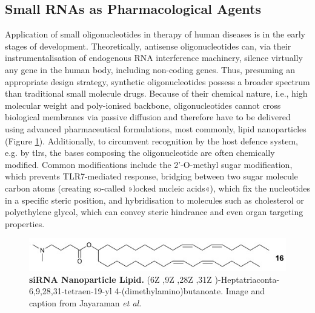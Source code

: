 \subsection{Small RNAs as Pharmacological Agents} \label{sec:discussion:smrna-therapy}
Application of small oligonucleotides in therapy of human diseases is in the early stages of development. Theoretically, antisense oligonucleotides can, via their instrumentalisation of endogenous RNA interference machinery, silence virtually any gene in the human body, including non-coding genes. Thus, presuming an appropriate design strategy, synthetic oligonucleotides possess a broader spectrum than traditional small molecule drugs. Because of their chemical nature, i.e., high molecular weight and poly-ionised backbone, oligonucleotides cannot cross biological membranes via passive diffusion and therefore have to be delivered using advanced pharmaceutical formulations, most commonly, lipid nanoparticles (Figure \ref{fig:lipid}).\cite{Akhtar2007, Whitehead2009} Additionally, to circumvent recognition by the host defence system, e.g. by \acp{tlr}, the bases composing the oligonucleotide are often chemically modified. Common modifications include the 2'-O-methyl sugar modification, which prevents TLR7-mediated response, bridging between two sugar molecule carbon atoms (creating so-called »locked nucleic acids«), which fix the nucleotides in a specific steric position, and hybridisation to molecules such as cholesterol or polyethylene glycol, which can convey steric hindrance and even organ targeting properties.\cite{Whitehead2009}

\begin{figure}
\centering
\includegraphics[width=.7\textwidth]{figures/mfig004}
\caption[siRNA Nanoparticle Lipid.]{\textbf{siRNA Nanoparticle Lipid.} (6Z ,9Z ,28Z ,31Z )-Heptatriaconta-6,9,28,31-tetraen-19-yl 4-(dimethylamino)butanoate. Image and caption from Jayaraman \emph{et al.}\cite{Jayaraman2012}
\label{fig:lipid}}
\end{figure}

